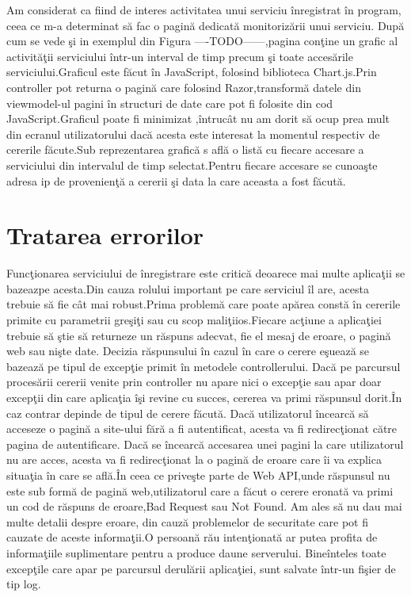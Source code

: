 \documentclass[a4paper,12pt]{report}
\begin{document}
Am considerat ca fiind de interes activitatea unui serviciu \^inregistrat \^in program,
ceea ce m-a determinat s\u a fac o pagin\u a dedicat\u a monitoriz\u arii unui serviciu.
Dup\u a cum se vede \c si in exemplul din Figura  ----TODO------,pagina con\c tine un 
grafic al activit\u a\c tii serviciului \^intr-un interval de timp precum \c si toate 
acces\u arile serviciului.Graficul este f\u acut \^in JavaScript, folosind biblioteca
Chart.js.Prin controller pot returna o pagin\u a care folosind Razor,transform\u a 
datele din viewmodel-ul pagini \^in structuri de date care pot fi folosite 
din cod JavaScript.Graficul poate fi minimizat ,\^intruc\^at nu am dorit s\u a ocup prea 
mult din ecranul utilizatorului dac\u a acesta este interesat la momentul respectiv de 
cererile f\u acute.Sub reprezentarea grafic\u a s afl\u a o list\u a cu fiecare accesare
a serviciului din intervalul de timp selectat.Pentru fiecare accesare se cunoa\c ste 
adresa ip de provenien\c t\u a a cererii \c si data la care aceasta a fost f\u acut\u a. 


\section{Tratarea errorilor}

Func\c tionarea serviciului de \^inregistrare este critic\u a deoarece mai multe 
aplica\c tii se bazeaz\ua pe acesta.Din cauza rolului important pe care serviciul
\^il are, acesta trebuie s\u a fie c\^at mai robust.Prima problem\u a care poate  
ap\u area const\u a \^in cererile primite cu parametrii gre\c si\c ti sau cu scop
mali\c tiios.Fiecare ac\c tiune a aplica\c tiei trebuie s\u a \c stie s\u a returneze
un r\u aspuns adecvat, fie el mesaj de eroare, o pagin\u a web sau ni\c ste date.
Decizia r\u aspunsului \^in cazul \^in care o cerere e\c sueaz\u a se bazeaz\u a pe tipul
de excep\c tie primit \^in metodele controllerului.
Dac\u a pe parcursul proces\u arii cererii venite prin controller nu apare nici o 
excep\c tie sau apar doar excep\c tii din care aplica\c tia \^i\c si revine cu succes,
cererea va primi r\u aspunsul dorit.\^In caz contrar depinde de tipul de cerere f\u acut\u a.
Dac\u a utilizatorul \^incearc\u a s\u a acceseze o pagin\u a a site-ului f\u ar\u a a fi
autentificat, acesta va fi redirec\c tionat c\u atre pagina de autentificare.
Dac\u a se \^incearc\u a accesarea unei pagini la care utilizatorul nu are acces, acesta 
va fi redirec\c tionat la o pagin\u a de eroare care \^ii va explica situa\c tia \^in care 
se afl\u a.\^In ceea ce prive\c ste parte de Web API,unde r\u aspunsul nu este sub form\u a 
de pagin\u a web,utilizatorul care a f\u acut o cerere eronat\u a va primi un cod de 
r\u aspuns de eroare,Bad Request sau Not Found.
Am ales s\u a nu dau mai multe detalii despre eroare, din cauz\u a problemelor de securitate
care pot fi cauzate de aceste informa\c tii.O persoan\u a r\u au inten\c tionat\u a ar putea 
profita de informa\c tiile suplimentare pentru a produce daune serverului.
Bine\^inteles toate excep\c tile care apar pe parcursul derul\u arii aplica\c tiei,
sunt salvate \^intr-un fi\c sier de tip log.
\end{document}
